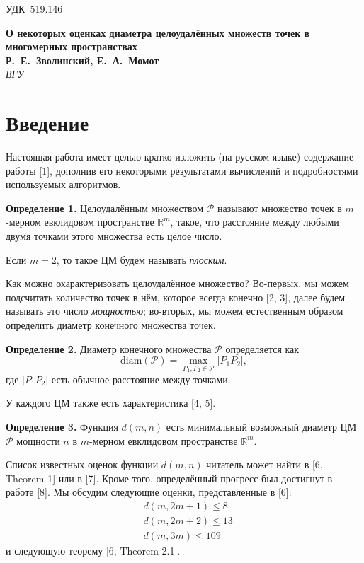 \documentclass[12pt]{article}
\begin{document}

\noindent УДК~519.146

\begin{center}
\textbf{О некоторых оценках диаметра целоудалённых множеств точек в многомерных пространствах} \\[3mm]
\textbf{Р.~Е.~Зволинский, Е.~А.~Момот} \\[2mm]
\emph{ВГУ}
\end{center}

\section{Введение}

Настоящая работа имеет целью кратко изложить (на русском языке) содержание работы [1], дополнив его некоторыми результатами
вычислений и подробностями используемых алгоритмов.

\par
\textbf{Определение 1.}
Целоудалённым множеством $\mathcal{P}$ называют множество точек в
$m$-мерном евклидовом пространстве $\mathbb{R}^{m}$, такое, что расстояние
между любыми двумя точками этого множества есть целое число.

Если $m = 2$, то такое ЦМ будем называть \textit{плоским}.

Как можно охарактеризовать целоудалённое множество?
Во-первых, мы можем подсчитать количество точек в нём,
которое всегда конечно [2, 3], далее будем называть это число \textit{мощностью};
во-вторых, мы можем естественным образом определить диаметр конечного множества точек.

\par
\textbf{Определение 2.}
Диаметр конечного множества $\mathcal{P}$ определяется как
\begin{equation}
\operatorname{diam(\mathcal{P})} = \underset{P_{1}, P_{2} \in
\mathcal{P}}{\max} |P_{1}P_{2}|,
\end{equation}
где $|P_1 P_2|$ есть обычное расстояние между точками.

У каждого ЦМ также есть характеристика
[4, 5].

\par
\textbf{Определение 3.}
Функция $d(m, n)$ есть минимальный возможный диаметр ЦМ $\mathcal{P}$ мощности $n$
в $m$-мерном евклидовом пространстве $\mathbb{R}^{m}$.

Список известных оценок функции $d(m, n)$
читатель может найти в [6, Theorem 1] или в [7].
Кроме того, определённый прогресс был достигнут в работе [8]. %
Мы обсудим следующие оценки, представленные в [6]:
\begin{align}
	&d(m, 2m + 1) \leq 8 \\
	&d(m, 2m + 2) \leq 13 \\
	&d(m, 3m) \leq 109
\end{align}
и следующую теорему [6, Theorem 2.1].
\end{document}
